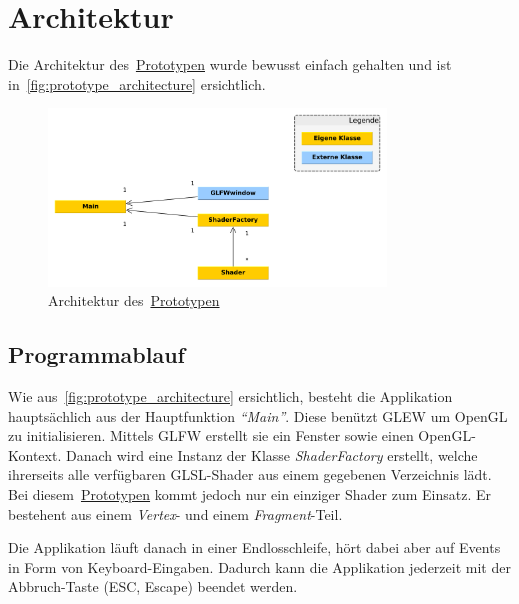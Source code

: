 
\section{Architektur}
\label{sec:architecture}

Die Architektur des~\hyperref[chap:prototype]{Prototypen} wurde bewusst einfach gehalten und ist
in~\autoref{fig:prototype_architecture} ersichtlich.

\begin{figure}[H]
    \centering
    \includegraphics[width=0.8\textwidth]{img/prototype_class_diagram.pdf}
    \caption{Architektur des~\hyperref[chap:prototype]{Prototypen}\protect\footnotemark}\label{fig:prototype_architecture}
\end{figure}

\subsection{Programmablauf}
\label{subsec:program_sequence}

Wie aus~\autoref{fig:prototype_architecture} ersichtlich, besteht die
Applikation hauptsächlich aus der Hauptfunktion \textit{``Main''}. Diese
benützt GLEW um OpenGL zu initialisieren. Mittels GLFW erstellt sie ein
Fenster sowie einen OpenGL-Kontext. Danach wird eine Instanz der Klasse
\textit{ShaderFactory} erstellt, welche ihrerseits alle verfügbaren
GLSL-Shader aus einem gegebenen Verzeichnis lädt. Bei diesem~\hyperref[chap:prototype]{Prototypen}
kommt jedoch nur ein einziger Shader zum Einsatz. Er bestehent aus einem
\textit{Vertex}- und einem \textit{Fragment}-Teil.

Die Applikation läuft danach in einer Endlosschleife, hört dabei aber
auf Events in Form von Keyboard-Eingaben. Dadurch kann die Applikation
jederzeit mit der Abbruch-Taste (ESC, Escape) beendet werden.

